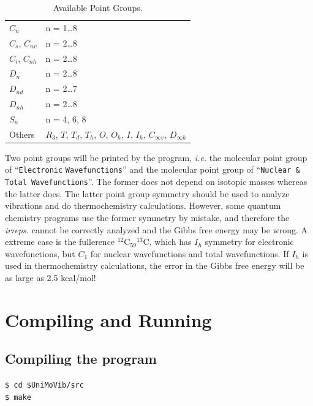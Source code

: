 \documentclass[12pt,english]{extarticle}
\begin{document}
\begin{table}[H]
\caption{Available Point Groups.}\label{tab:symm}
\small\centering
\begin{tabular}{ll}
\hline\hline
$C_{n}$           & n = 1\ldots 8 \\
$C_s$, $C_{nv}$   & n = 2\ldots 8 \\
$C_i$, $C_{nh}$   & n = 2\ldots 8 \\
$D_{n}$           & n = 2\ldots 8 \\
$D_{nd}$          & n = 2\ldots 7 \\
$D_{nh}$          & n = 2\ldots 8 \\
$S_{n}$           & n = 4, 6, 8 \\
Others            & $R_3$, $T$, $T_d$, $T_h$, $O$, $O_h$, $I$, $I_h$, $C_{\infty v}$, $D_{\infty h}$ \\
\hline\hline
\end{tabular}
\end{table}

Two point groups will be printed by the program, \emph{i.e.} the molecular point group of ``\verb|Electronic| \verb|Wavefunctions|'' and the molecular point group of ``\verb|Nuclear & Total Wavefunctions|''. The former does not depend on isotopic masses whereas the latter does. The latter point group symmetry should be used to analyze vibrations and do thermochemistry calculations. However, some quantum chemistry programs use the former symmetry by mistake, and therefore the \emph{irreps.} cannot be correctly analyzed and the Gibbs free energy may be wrong. A extreme case is the fullerence $^{12}$C$_{59}{}^{13}$C, which has $I_h$ symmetry for electronic wavefunctions, but $C_1$ for nuclear wavefunctions and total wavefunctions. If $I_h$ is used in thermochemistry calculations, the error in the Gibbs free energy will be as large as 2.5 kcal/mol!

\pagebreak{}


\section{Compiling and Running} \label{part:setting}

\subsection{Compiling the program} \label{sec:install}

\verb|$ cd $UniMoVib/src| \\
\verb|$ make |
\end{document}
